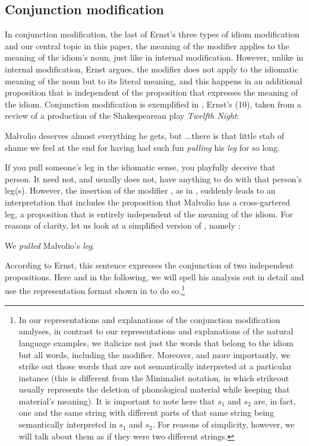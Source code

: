 \documentclass[output=paper]{langsci/langscibook}
\begin{document}
\subsection{Conjunction modification} \label{ConjMod}

In conjunction modification, the last of Ernst's three types of idiom modification and our central topic in this paper, the meaning of the modifier applies to the meaning of the idiom's noun, just like in internal modification. However, unlike in internal modification, Ernst argues, the modifier does not apply to the idiomatic meaning of the noun but to its literal meaning, and this happens in an additional proposition that is independent of the proposition that expresses the meaning of the idiom. Conjunction modification is exemplified in , Ernst's (10), taken from a review of a production of the Shakespearean play \textit{Twelfth Night}:

\ea \label{cross-gartered leg}
Malvolio deserves almost everything he gets, but ...\@ there is that little stab of shame we feel at the end for having had such fun \textit{pulling} his \underline{}\underline{} \textit{leg} for so long.
\z

\noindent If you pull someone's leg in the idiomatic sense, you playfully deceive that person. It need not, and usually does not, have anything to do with that person's leg(s). However, the insertion of the modifier \underline{}, as in , suddenly leads to an interpretation that includes the proposition that Malvolio has a cross-gartered leg, a proposition that is entirely independent of the meaning of the idiom. For reasons of clarity, let us look at a simplified version of , namely : 

\ea \label{cross-gartered leg -- simple}
We \textit{pulled} Malvolio's \underline{} \textit{leg}.
\z

\noindent According to Ernst, this sentence expresses the conjunction of two independent propositions. Here and in the following, we will spell his analysis out in detail and use the representation format shown in  to do so.\footnote{In our representations and explanations of the conjunction modification analyses, in contrast to our representations and explanations of the natural language examples, we italicize not just the words that belong to the idiom but all words, including the modifier. Moreover, and more importantly, we strike out those words that are not semantically interpreted at a particular instance (this is different from the Minimalist notation, in which strikeout usually represents the deletion of phonological material while keeping that material's meaning). It is important to note here that $s_{1}$ and $s_{2}$ are, in fact, one and the same string with different parts of that same string being semantically interpreted in $s_{1}$ and $s_{2}$. For reasons of simplicity, however, we will talk about them as if they were two different strings.\label{strings}}
\end{document}
